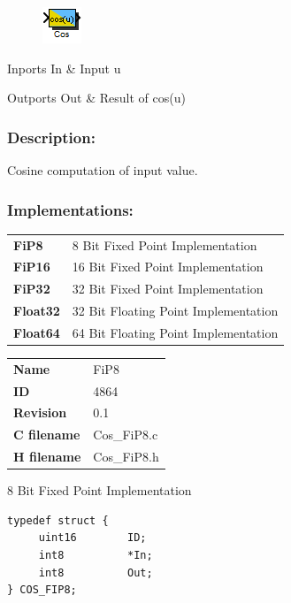 \label{block:Cos}
\begin{figure}[H]\includegraphics{Cos}\end{figure} 

\begin{XtoCtabular}{Inports}
In & Input u\tabularnewline
\hline
\end{XtoCtabular}


\begin{XtoCtabular}{Outports}
Out & Result of cos(u)\tabularnewline
\hline
\end{XtoCtabular}

\subsubsection*{Description:}
Cosine computation of input value.


\subsubsection*{Implementations:}
\begin{tabular}{l l}
\textbf{FiP8} & 8 Bit Fixed Point Implementation\tabularnewline
\textbf{FiP16} & 16 Bit Fixed Point Implementation\tabularnewline
\textbf{FiP32} & 32 Bit Fixed Point Implementation\tabularnewline
\textbf{Float32} & 32 Bit Floating Point Implementation\tabularnewline
\textbf{Float64} & 64 Bit Floating Point Implementation\tabularnewline
\end{tabular}

\nopagebreak[0]
\begin{tabular}{l l}
\textbf{Name} & FiP8 \tabularnewline
\textbf{ID} & 4864 \tabularnewline
\textbf{Revision} & 0.1 \tabularnewline
\textbf{C filename} & Cos\_FiP8.c \tabularnewline
\textbf{H filename} & Cos\_FiP8.h \tabularnewline
\end{tabular}
\vspace{1ex}

8 Bit Fixed Point Implementation

\begin{lstlisting}
typedef struct {
     uint16        ID;
     int8          *In;
     int8          Out;
} COS_FIP8;
\end{lstlisting}


